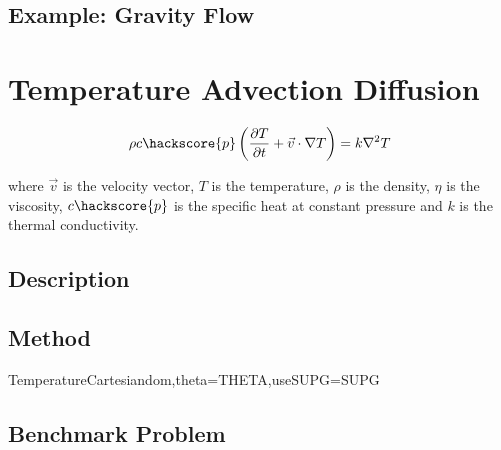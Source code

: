 \subsection{Example: Gravity Flow}

\section{Temperature Advection Diffusion\label{TEMP ADV DIFF}}

\begin{equation}
\rho c\hackscore{p} \left (\frac{\partial T}{\partial t} + \vec{v} \cdot \nabla T \right ) = k \nabla^{2}T
\label{HEAT EQUATION}
\end{equation}

where $\vec{v}$ is the velocity vector, $T$ is the temperature, $\rho$ is the density, $\eta$ is the viscosity, $c\hackscore{p}$ is the specific heat at constant pressure and $k$ is the thermal conductivity.

\subsection{Description}

\subsection{Method}

\begin{classdesc}{TemperatureCartesian}{dom,theta=THETA,useSUPG=SUPG}
\end{classdesc}

\subsection{Benchmark Problem}




